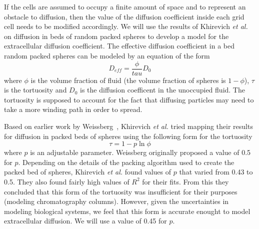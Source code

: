 \documentclass[12pt]{article}
\begin{document}
If the cells are assumed to occupy a finite amount of space and to represent an obstacle
to diffusion, then the value of the diffusion coefficient inside each grid cell needs to
be modified accordingly. We will use the results of Khirevich {\em et al.}~\cite{Khirevich}
on diffusion in beds of random packed spheres to develop a model for the extracellular
diffusion coefficient. The effective diffusion coefficient in a bed random packed spheres
can be modeled by an equation of the form
\[
D_{eff} = \frac{\phi}{tau}D_0
\]
where $\phi$ is the volume fraction of fluid (the volume fraction of spheres is $1-\phi$),
$\tau$ is the tortuosity and $D_0$ is the diffusion coefficent in the unoccupied fluid. The
tortuosity is supposed to account for the fact that diffusing particles may need to take a
more winding path in order to spread.

Based on earlier work by Weissberg~\cite{Weissberg}, Khirevich
{\em et al.} tried mapping their results for diffusion in packed beds of spheres using the
following form for the tortuosity
\[
\tau = 1 - p\ln \phi
\]
where $p$ is an adjustable parameter. Weissberg originally proposed a value of 0.5 for $p$.
Depending on the details of the packing algorithm used to create the packed bed of spheres,
Khirevich {\em et al.} found values of $p$ that varied from 0.43 to 0.5. They also found
fairly high values of $R^2$ for their fits. From this they concluded that this form of the
tortuosity was insufficient for their purposes (modeling chromatography columns). However,
given the uncertainties in modeling biological systems, we feel that this form is accurate
enought to model extracellular diffusion. We will use a value of 0.45 for $p$.
\end{document}
